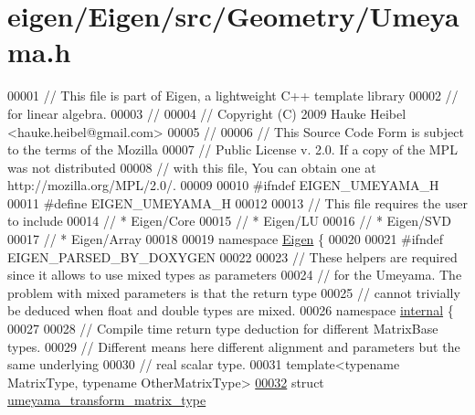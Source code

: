 \hypertarget{eigen_2_eigen_2src_2_geometry_2_umeyama_8h_source}{}\section{eigen/\+Eigen/src/\+Geometry/\+Umeyama.h}
\label{eigen_2_eigen_2src_2_geometry_2_umeyama_8h_source}

\begin{DoxyCode}
00001 \textcolor{comment}{// This file is part of Eigen, a lightweight C++ template library}
00002 \textcolor{comment}{// for linear algebra.}
00003 \textcolor{comment}{//}
00004 \textcolor{comment}{// Copyright (C) 2009 Hauke Heibel <hauke.heibel@gmail.com>}
00005 \textcolor{comment}{//}
00006 \textcolor{comment}{// This Source Code Form is subject to the terms of the Mozilla}
00007 \textcolor{comment}{// Public License v. 2.0. If a copy of the MPL was not distributed}
00008 \textcolor{comment}{// with this file, You can obtain one at http://mozilla.org/MPL/2.0/.}
00009 
00010 \textcolor{preprocessor}{#ifndef EIGEN\_UMEYAMA\_H}
00011 \textcolor{preprocessor}{#define EIGEN\_UMEYAMA\_H}
00012 
00013 \textcolor{comment}{// This file requires the user to include }
00014 \textcolor{comment}{// * Eigen/Core}
00015 \textcolor{comment}{// * Eigen/LU }
00016 \textcolor{comment}{// * Eigen/SVD}
00017 \textcolor{comment}{// * Eigen/Array}
00018 
00019 \textcolor{keyword}{namespace }\hyperlink{namespace_eigen}{Eigen} \{ 
00020 
00021 \textcolor{preprocessor}{#ifndef EIGEN\_PARSED\_BY\_DOXYGEN}
00022 
00023 \textcolor{comment}{// These helpers are required since it allows to use mixed types as parameters}
00024 \textcolor{comment}{// for the Umeyama. The problem with mixed parameters is that the return type}
00025 \textcolor{comment}{// cannot trivially be deduced when float and double types are mixed.}
00026 \textcolor{keyword}{namespace }\hyperlink{namespaceinternal}{internal} \{
00027 
00028 \textcolor{comment}{// Compile time return type deduction for different MatrixBase types.}
00029 \textcolor{comment}{// Different means here different alignment and parameters but the same underlying}
00030 \textcolor{comment}{// real scalar type.}
00031 \textcolor{keyword}{template}<\textcolor{keyword}{typename} MatrixType, \textcolor{keyword}{typename} OtherMatrixType>
\hyperlink{struct_eigen_1_1internal_1_1umeyama__transform__matrix__type}{00032} \textcolor{keyword}{struct }\hyperlink{struct_eigen_1_1internal_1_1umeyama__transform__matrix__type}{umeyama\_transform\_matrix\_type}

\end{DoxyCode}
